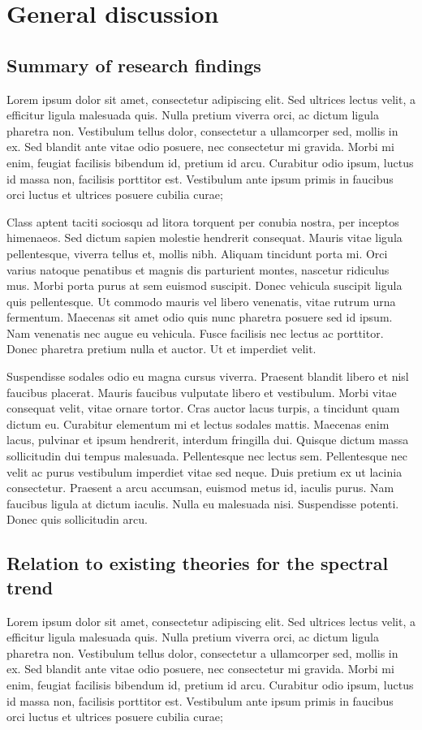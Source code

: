\chapter{General discussion}
\label{sec:conclusion}

\section{Summary of research findings}

Lorem ipsum dolor sit amet, consectetur adipiscing elit. Sed ultrices lectus velit, a efficitur ligula malesuada quis. Nulla pretium viverra orci, ac dictum ligula pharetra non. Vestibulum tellus dolor, consectetur a ullamcorper sed, mollis in ex. Sed blandit ante vitae odio posuere, nec consectetur mi gravida. Morbi mi enim, feugiat facilisis bibendum id, pretium id arcu. Curabitur odio ipsum, luctus id massa non, facilisis porttitor est. Vestibulum ante ipsum primis in faucibus orci luctus et ultrices posuere cubilia curae;

Class aptent taciti sociosqu ad litora torquent per conubia nostra, per inceptos himenaeos. Sed dictum sapien molestie hendrerit consequat. Mauris vitae ligula pellentesque, viverra tellus et, mollis nibh. Aliquam tincidunt porta mi. Orci varius natoque penatibus et magnis dis parturient montes, nascetur ridiculus mus. Morbi porta purus at sem euismod suscipit. Donec vehicula suscipit ligula quis pellentesque. Ut commodo mauris vel libero venenatis, vitae rutrum urna fermentum. Maecenas sit amet odio quis nunc pharetra posuere sed id ipsum. Nam venenatis nec augue eu vehicula. Fusce facilisis nec lectus ac porttitor. Donec pharetra pretium nulla et auctor. Ut et imperdiet velit.

Suspendisse sodales odio eu magna cursus viverra. Praesent blandit libero et nisl faucibus placerat. Mauris faucibus vulputate libero et vestibulum. Morbi vitae consequat velit, vitae ornare tortor. Cras auctor lacus turpis, a tincidunt quam dictum eu. Curabitur elementum mi et lectus sodales mattis. Maecenas enim lacus, pulvinar et ipsum hendrerit, interdum fringilla dui. Quisque dictum massa sollicitudin dui tempus malesuada. Pellentesque nec lectus sem. Pellentesque nec velit ac purus vestibulum imperdiet vitae sed neque. Duis pretium ex ut lacinia consectetur. Praesent a arcu accumsan, euismod metus id, iaculis purus. Nam faucibus ligula at dictum iaculis. Nulla eu malesuada nisi. Suspendisse potenti. Donec quis sollicitudin arcu.

\section{Relation to existing theories for the spectral trend}
Lorem ipsum dolor sit amet, consectetur adipiscing elit. Sed ultrices lectus velit, a efficitur ligula malesuada quis. Nulla pretium viverra orci, ac dictum ligula pharetra non. Vestibulum tellus dolor, consectetur a ullamcorper sed, mollis in ex. Sed blandit ante vitae odio posuere, nec consectetur mi gravida. Morbi mi enim, feugiat facilisis bibendum id, pretium id arcu. Curabitur odio ipsum, luctus id massa non, facilisis porttitor est. Vestibulum ante ipsum primis in faucibus orci luctus et ultrices posuere cubilia curae;

